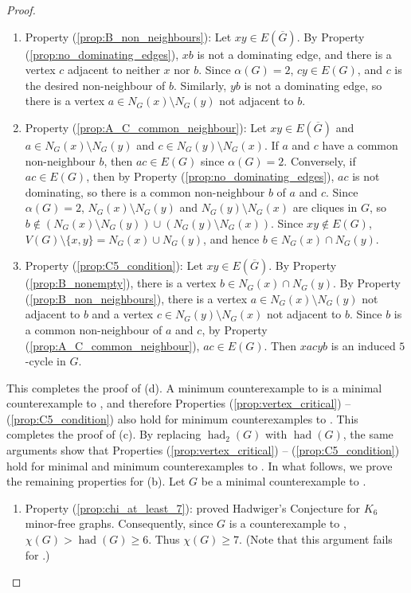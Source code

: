 \documentclass[11pt]{article}
\numberwithin{equation}{section}
\theoremstyle{plain}
\theoremstyle{definition}
\renewcommand{\geq}{\geqslant}
\DeclareMathOperator{\had}{had}
\newcommand{\propref}[1]{\textup{(\ref{#1})}}
\begin{document}
\begin{proof}
\begin{enumerate}[label={}, leftmargin=0em, itemsep=1.5pt]
        \item Property \propref{prop:B_non_neighbours}: Let $xy \in E(\overline{G})$. By Property \propref{prop:no_dominating_edges}, $xb$ is not a dominating edge, and there is a vertex $c$ adjacent to neither $x$ nor $b$. Since $\alpha(G) = 2$, $cy \in E(G)$, and $c$ is the desired non-neighbour of $b$. Similarly, $yb$ is not a dominating edge, so there is a vertex $a \in N_G(x) \setminus N_G(y)$ not adjacent to $b$.
        \item Property \propref{prop:A_C_common_neighbour}: Let $xy \in E(\overline{G})$ and $a \in N_G(x) \setminus N_G(y)$ and $c \in N_G(y) \setminus N_G(x)$. If $a$ and $c$ have a common non-neighbour $b$, then $ac \in E(G)$ since $\alpha(G) = 2$. Conversely, if $ac \in E(G)$, then by Property \propref{prop:no_dominating_edges}, $ac$ is not dominating, so there is a common non-neighbour $b$ of $a$ and $c$. Since $\alpha(G) = 2$, $N_G(x) \setminus N_G(y)$ and $N_G(y) \setminus N_G(x)$ are cliques in $G$, so $b \notin (N_G(x) \setminus N_G(y)) \cup (N_G(y) \setminus N_G(x))$. Since $xy \notin E(G)$, $V(G) \setminus \{x, y\} = N_G(x) \cup N_G(y)$, and hence $b \in N_G(x) \cap N_G(y)$.
        \item Property \propref{prop:C5_condition}: Let $xy \in E(\overline{G})$. By Property \propref{prop:B_nonempty}, there is a vertex $b \in N_G(x) \cap N_G(y)$. By Property \propref{prop:B_non_neighbours}, there is a vertex $a \in N_G(x) \setminus N_G(y)$ not adjacent to $b$ and a vertex $c \in N_G(y) \setminus N_G(x)$ not adjacent to $b$. Since $b$ is a common non-neighbour of $a$ and $c$, by Property \propref{prop:A_C_common_neighbour}, $ac \in E(G)$. Then $xacyb$ is an induced $5$-cycle in $G$.
    \end{enumerate}
    This completes the proof of (d). A minimum counterexample to  is a minimal counterexample to , and therefore Properties \propref{prop:vertex_critical} -- \propref{prop:C5_condition} also hold for minimum counterexamples to . This completes the proof of (c).
    By replacing $\had_2(G)$ with $\had(G)$, the same arguments show that Properties \propref{prop:vertex_critical} -- \propref{prop:C5_condition} hold for minimal and minimum counterexamples to . In what follows, we prove the remaining properties for (b). Let $G$ be a minimal counterexample to .
    \begin{enumerate}[label={}, leftmargin=0em, itemsep=1.5pt]
        \item Property \propref{prop:chi_at_least_7}: \citet{RST-Comb93} proved Hadwiger's Conjecture for $K_6$ minor-free graphs. Consequently, since $G$ is a counterexample to , $\chi(G) > \had(G) \geq 6$. Thus $\chi(G) \geq 7$. (Note that this argument fails for .)

\end{enumerate}
\end{proof}
\end{document}
